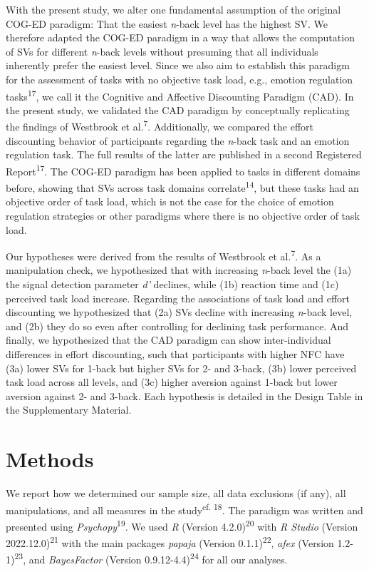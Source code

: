 \documentclass[
  man,floatsintext]{apa6}
\begin{document}
With the present study, we alter one fundamental assumption of the original COG-ED paradigm: That the easiest \emph{n}-back level has the highest SV.
We therefore adapted the COG-ED paradigm in a way that allows the computation of SVs for different \emph{n}-back levels without presuming that all individuals inherently prefer the easiest level.
Since we also aim to establish this paradigm for the assessment of tasks with no objective task load, e.g., emotion regulation tasks\textsuperscript{17}, we call it the Cognitive and Affective Discounting Paradigm (CAD).
In the present study, we validated the CAD paradigm by conceptually replicating the findings of Westbrook et al.\textsuperscript{7}.
Additionally, we compared the effort discounting behavior of participants regarding the \emph{n}-back task and an emotion regulation task.
The full results of the latter are published in a second Registered Report\textsuperscript{17}.
The COG-ED paradigm has been applied to tasks in different domains before, showing that SVs across task domains correlate\textsuperscript{14}, but these tasks had an objective order of task load, which is not the case for the choice of emotion regulation strategies or other paradigms where there is no objective order of task load.

Our hypotheses were derived from the results of Westbrook et al.\textsuperscript{7}.
As a manipulation check, we hypothesized that with increasing \emph{n}-back level the (1a) the signal detection parameter \emph{d'} declines, while (1b) reaction time and (1c) perceived task load increase.
Regarding the associations of task load and effort discounting we hypothesized that (2a) SVs decline with increasing \emph{n}-back level, and (2b) they do so even after controlling for declining task performance.
And finally, we hypothesized that the CAD paradigm can show inter-individual differences in effort discounting, such that participants with higher NFC have (3a) lower SVs for 1-back but higher SVs for 2- and 3-back, (3b) lower perceived task load across all levels, and (3c) higher aversion against 1-back but lower aversion against 2- and 3-back.
Each hypothesis is detailed in the Design Table in the Supplementary Material.

\hypertarget{methods}{%
\section{Methods}\label{methods}}

We report how we determined our sample size, all data exclusions (if any), all manipulations, and all measures in the study\textsuperscript{cf. 18}.
The paradigm was written and presented using \emph{Psychopy}\textsuperscript{19}.
We used \emph{R} (Version 4.2.0)\textsuperscript{20} with \emph{R Studio} (Version 2022.12.0)\textsuperscript{21} with the main packages \emph{papaja} (Version 0.1.1)\textsuperscript{22}, \emph{afex} (Version 1.2-1)\textsuperscript{23}, and \emph{BayesFactor} (Version 0.9.12-4.4)\textsuperscript{24} for all our analyses.
\end{document}
